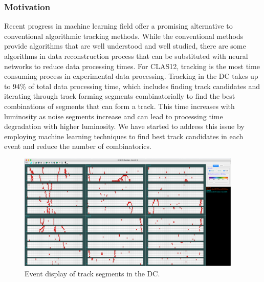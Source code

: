 \subsubsection{Motivation}
Recent progress in machine learning field offer a promising alternative to conventional
algorithmic tracking methods. While the conventional
methods provide algorithms that are well understood and well studied, there are some algorithms
in data reconstruction process that can be substituted with neural networks to reduce data
processing times. For CLAS12, tracking is the most time consuming process in experimental data processing.
Tracking in the DC takes up to 94\% of total data processing time, which includes finding
track candidates and iterating through track forming segments combinatorially to find the best
combinations of segments that can form a track. This time increases with luminosity as noise
segments increase and can lead to processing time degradation with higher luminosity. We have started 
to address this issue by employing machine learning techniques to find best track candidates in
each event and reduce the number of combinatorics.
\begin{figure}
\centering
\includegraphics[width=0.95\textwidth]{pics/nn1.png}
\caption{Event display of track segments in the DC. 
}
\label{fig:nn1}
\end{figure}

